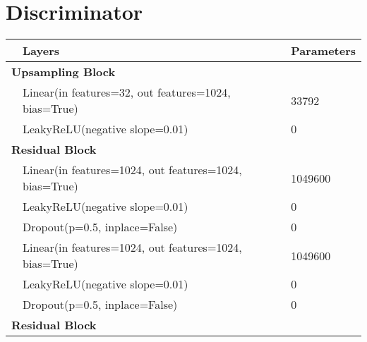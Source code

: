 \newpage

\section{Discriminator}
\begin{center}
    \begin{tabular}{ p{} p{}  p{}}

                                                      & \textbf{Layers}                                        & \textbf{Parameters} \\
        \hline
        \multicolumn{2}{l}{\textbf{Upsampling Block}} &                                                                              \\

                                                      & Linear(in features=32, out features=1024, bias=True)   & 33792               \\
                                                      & LeakyReLU(negative slope=0.01)                         & 0                   \\
        \multicolumn{2}{l}{\textbf{Residual Block}}   &                                                                              \\
                                                      & Linear(in features=1024, out features=1024, bias=True) & 1049600             \\
                                                      & LeakyReLU(negative slope=0.01)                         & 0                   \\
                                                      & Dropout(p=0.5, inplace=False)                          & 0                   \\
                                                      & Linear(in features=1024, out features=1024, bias=True) & 1049600             \\
                                                      & LeakyReLU(negative slope=0.01)                         & 0                   \\
                                                      & Dropout(p=0.5, inplace=False)                          & 0                   \\
        \multicolumn{2}{l}{\textbf{Residual Block}}   &                                                                              \\

\end{tabular}
\end{center}
